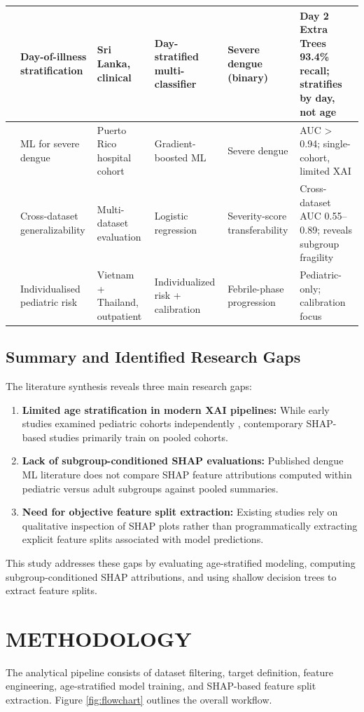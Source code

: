 \documentclass[12pt, a4paper]{report}
\begin{document}
\begin{xltabular}{\textwidth}{|c|X|X|X|X|X|}
\hline
\cite{halwala2025} & Day-of-illness stratification & Sri Lanka, clinical & Day-stratified multi-classifier & Severe dengue (binary) & Day 2 Extra Trees 93.4\% recall; stratifies by day, not age \\
\hline
\cite{madewell2024} & ML for severe dengue & Puerto Rico hospital cohort & Gradient-boosted ML & Severe dengue & AUC > 0.94; single-cohort, limited XAI \\
\hline
\cite{lu2025} & Cross-dataset generalizability & Multi-dataset evaluation & Logistic regression & Severity-score transferability & Cross-dataset AUC 0.55--0.89; reveals subgroup fragility \\
\hline
\cite{sangkaew2026} & Individualised pediatric risk & Vietnam + Thailand, outpatient & Individualized risk + calibration & Febrile-phase progression & Pediatric-only; calibration focus \\
\hline
\end{xltabular}
\endgroup

\section{Summary and Identified Research Gaps}
The literature synthesis reveals three main research gaps:
\begin{enumerate}
    \item \textbf{Limited age stratification in modern XAI pipelines:} While early studies examined pediatric cohorts independently \cite{potts2010, tanner2008}, contemporary SHAP-based studies primarily train on pooled cohorts.
    \item \textbf{Lack of subgroup-conditioned SHAP evaluations:} Published dengue ML literature does not compare SHAP feature attributions computed within pediatric versus adult subgroups against pooled summaries.
    \item \textbf{Need for objective feature split extraction:} Existing studies rely on qualitative inspection of SHAP plots rather than programmatically extracting explicit feature splits associated with model predictions.
\end{enumerate}
This study addresses these gaps by evaluating age-stratified modeling, computing subgroup-conditioned SHAP attributions, and using shallow decision trees to extract feature splits.

\chapter{METHODOLOGY}
The analytical pipeline consists of dataset filtering, target definition, feature engineering, age-stratified model training, and SHAP-based feature split extraction. Figure \ref{fig:flowchart} outlines the overall workflow.
\end{document}
